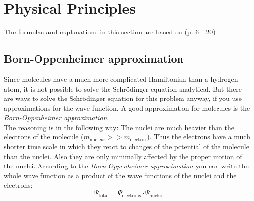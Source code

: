 \section{Physical Principles}
The formulas and explanations in this section are based on \cite{bitsch} (p. 6 - 20) 
\subsection{Born-Oppenheimer approximation}
Since molecules have a much more complicated Hamiltonian than a hydrogen atom, it is not possible to solve the Schrödinger equation analytical. 
But there are ways to solve the Schrödinger equation for this problem anyway, if you use approximations for the wave function.
A good approximation for molecules is the \emph{Born-Oppenheimer approximation}.  \\
The reasoning is in the following way: The nuclei are much heavier than the electrons of the molecule ($m_{\text{nucleus}} >> m_{\text{electron}}$). 
Thus the electrons have a much shorter time scale in which they react to changes of the potential of the molecule than the nuclei. Also they are 
only minimally affected by the proper motion of the nuclei. According to the \emph{Born-Oppenheimer approximation} 
you can write the whole wave function as a product of the wave functions of the nuclei and the electrons:
\begin{equation}
\label{eq:boapprox}
  \Psi_{\text{total}} = \Psi_{\text{electrons}} \cdot \Psi_{\text{nuclei}}
\end{equation}


